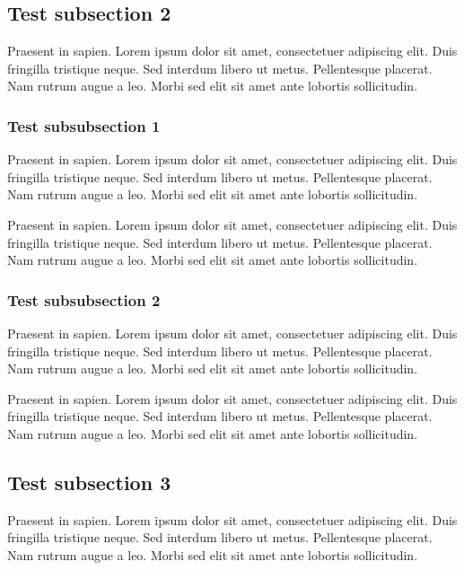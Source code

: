 \documentclass[a5paper,12pt,draft]{book} %
\begin{document}
\subsection*{Test subsection 2}
Praesent in sapien. Lorem ipsum dolor sit amet, consectetuer adipiscing elit.
Duis fringilla tristique neque. Sed interdum libero ut metus. Pellentesque placerat.
Nam rutrum augue a leo. Morbi sed elit sit amet ante lobortis sollicitudin.

\subsubsection*{Test subsubsection 1}
Praesent in sapien. Lorem ipsum dolor sit amet, consectetuer adipiscing elit.
Duis fringilla tristique neque. Sed interdum libero ut metus. Pellentesque placerat.
Nam rutrum augue a leo. Morbi sed elit sit amet ante lobortis sollicitudin.

Praesent in sapien. Lorem ipsum dolor sit amet, consectetuer adipiscing elit.
Duis fringilla tristique neque. Sed interdum libero ut metus. Pellentesque placerat.
Nam rutrum augue a leo. Morbi sed elit sit amet ante lobortis sollicitudin.

\subsubsection*{Test subsubsection 2}
Praesent in sapien. Lorem ipsum dolor sit amet, consectetuer adipiscing elit.
Duis fringilla tristique neque. Sed interdum libero ut metus. Pellentesque placerat.
Nam rutrum augue a leo. Morbi sed elit sit amet ante lobortis sollicitudin.

Praesent in sapien. Lorem ipsum dolor sit amet, consectetuer adipiscing elit.
Duis fringilla tristique neque. Sed interdum libero ut metus. Pellentesque placerat.
Nam rutrum augue a leo. Morbi sed elit sit amet ante lobortis sollicitudin.

\subsection*{Test subsection 3}
Praesent in sapien. Lorem ipsum dolor sit amet, consectetuer adipiscing elit.
Duis fringilla tristique neque. Sed interdum libero ut metus. Pellentesque placerat.
Nam rutrum augue a leo. Morbi sed elit sit amet ante lobortis sollicitudin.
\end{document}
